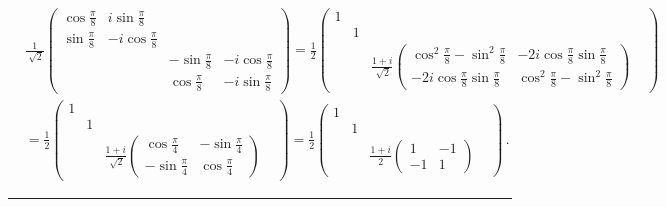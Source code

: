 \documentclass[11pt]{article}
\numberwithin{equation}{section} %
\numberwithin{figure}{section} %
\begin{document}
\begin{appendices}
\begin{equation}
\begin{split}
&	\frac{1}{\sqrt[]{2}}\begin{pmatrix} \cos\frac{\pi}{8}&i\sin\frac{\pi}{8}&&\\ \sin\frac{\pi}{8}&-i\cos\frac{\pi}{8}&&\\ &&-\sin\frac{\pi}{8}&-i\cos\frac{\pi}{8}\\ &&\cos\frac{\pi}{8}&-i\sin\frac{\pi}{8} \end{pmatrix} = \frac{1}{2} \begin{pmatrix} 1&&&\\&1&&\\ &&\frac{1+i}{\sqrt[]{2}} \begin{pmatrix} \cos^2\frac{\pi}{8}-\sin^2\frac{\pi}{8}&-2i\cos\frac{\pi}{8}\sin\frac{\pi}{8}\\-2i\cos\frac{\pi}{8}\sin\frac{\pi}{8}&\cos^2\frac{\pi}{8}-\sin^2\frac{\pi}{8} \end{pmatrix} \end{pmatrix}\\
&	= \frac{1}{2} \begin{pmatrix} 1&&&\\&1&&\\ && \frac{1+i}{\sqrt[]{2}} \begin{pmatrix} \cos\frac{\pi}{4}&-\sin\frac{\pi}{4}\\-\sin\frac{\pi}{4}&\cos\frac{\pi}{4} \end{pmatrix} \end{pmatrix} = \frac{1}{2} \begin{pmatrix} 1&&&\\&1&&\\ &&\frac{1+i}{2} \begin{pmatrix} 1&-1\\-1&1 \end{pmatrix} \end{pmatrix}\,\textrm{.}
\end{split} 
\end{equation}
\noindent
{\color{red} \rule{\linewidth}{0.5mm} }







\vspace{1cm}
\subsection{} \label{U_10 U_21 proof}


\end{appendices}
\end{document}
